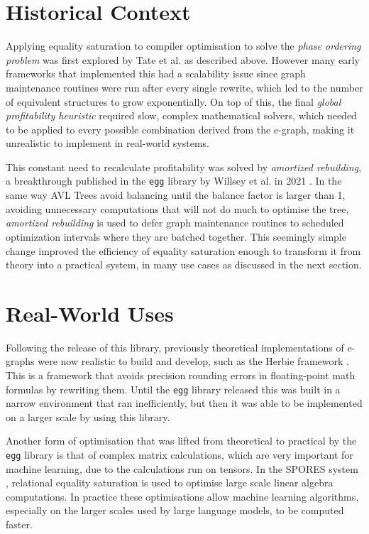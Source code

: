 \documentclass[11pt, a4paper]{article}
\begin{document}
\section{Historical Context}

Applying equality saturation to compiler optimisation to solve the \emph{phase ordering problem} was first explored by Tate et al. as described above. However many 
early frameworks that implemented this had a scalability issue since graph maintenance routines were run after every single rewrite, which led to the number of
equivalent structures to grow exponentially. On top of this, the final \emph{global profitability heuristic} required slow, complex mathematical solvers,
which needed to be applied to every possible combination derived from the e-graph, making it unrealistic to implement in real-world systems.

\smallskip

This constant need to recalculate profitability was solved by \emph{amortized rebuilding}, a breakthrough published in the \texttt{egg} library by Willsey et al.
in 2021 \cite{willsey2021}. In the same way AVL Trees avoid balancing until the balance factor is larger than 1, avoiding unnecessary computations that will not 
do much to optimise the tree, \emph{amortized rebuilding} is used to defer graph maintenance routines to scheduled optimization intervals where they are batched
together. This seemingly simple change improved the efficiency of equality saturation enough to transform it from theory into a practical system, in many use cases 
as discussed in the next section.

\section{Real-World Uses}

Following the release of this library, previously theoretical implementations of e-graphs were now realistic to build and develop, such as the Herbie framework 
\cite{herbie2015}. This is a framework that avoids precision rounding errors in floating-point math formulas by rewriting them. Until the \texttt{egg} library 
released this was built in a narrow environment that ran inefficiently, but then it was able to be implemented on a larger scale by using this library.

\smallskip

Another form of optimisation that was lifted from theoretical to practical by the \texttt{egg} library is that of complex matrix calculations, which are very important
for machine learning, due to the calculations run on tensors. In the SPORES system \cite{spores2020}, relational equality saturation is used to optimise large scale
linear algebra computations. In practice these optimisations allow machine learning algorithms, especially on the larger scales used by large language models, to 
be computed faster.
\end{document}
